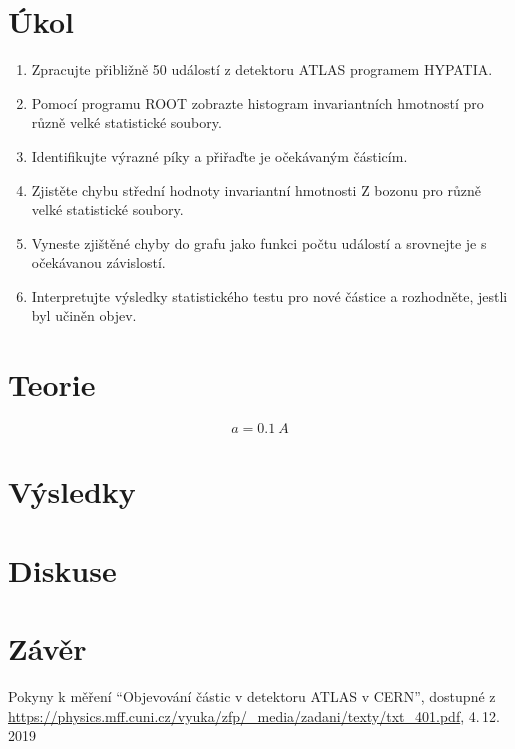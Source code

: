 \documentclass{scirep}
\begin{document}
    \section*{Úkol}

    \begin{enumerate}

        \item Zpracujte přibližně 50 událostí z detektoru ATLAS programem HYPATIA.
        \item Pomocí programu ROOT zobrazte histogram invariantních hmotností pro různě velké statistické soubory.
        \item Identifikujte výrazné píky a přiřaďte je očekávaným částicím.
        \item Zjistěte chybu střední hodnoty invariantní hmotnosti Z bozonu pro různě velké statistické soubory.
        \item Vyneste zjištěné chyby do grafu jako funkci počtu událostí a srovnejte je s očekávanou závislostí.
        \item Interpretujte výsledky statistického testu pro nové částice a rozhodněte, jestli byl učiněn objev.

    \end{enumerate}

    \section*{Teorie}

    \[ a = \SI{0,1}{A} \]

    \section*{Výsledky}

    \section*{Diskuse}

    \section*{Závěr}

    \begin{thebibliography}{}

        Pokyny k měření ``Objevování částic v detektoru ATLAS v CERN'', dostupné z\\ \url{https://physics.mff.cuni.cz/vyuka/zfp/_media/zadani/texty/txt_401.pdf}, 4.\,12.\,2019

    \end{thebibliography}
\end{document}
